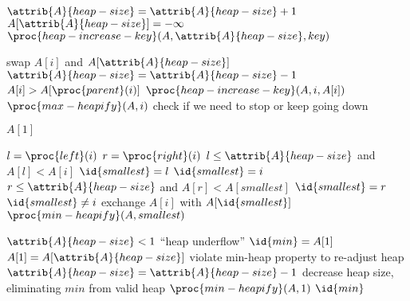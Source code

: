 \documentclass[12pt]{article}
\begin{document}
\begin{codebox}
\li $\attrib{A}{heap-size} = \attrib{A}{heap-size} + 1$
\li $A[\attrib{A}{heap-size}] = -\infty$
\li $\proc{heap-increase-key}(A, \attrib{A}{heap-size}, key)$
\end{codebox}

\begin{codebox}
\li swap $A[i]$ and $A[\attrib{A}{heap-size}]$
\li $\attrib{A}{heap-size} = \attrib{A}{heap-size} - 1$
\li \If $A[i] > A[\proc{parent}(i)]$
\li \Then
        $\proc{heap-increase-key}(A, i, A[i])$
    \End
\li \Else
\li \Then
        $\proc{max-heapify}(A, i)$ \Comment check if we need to stop or keep going down
    \End
\end{codebox}

\newpage

\begin{codebox}
\li \Return $A[1]$
\end{codebox}

\begin{codebox}
\li $l = \proc{left}(i)$
\li $r = \proc{right}(i)$
\li \If $l \leq \attrib{A}{heap-size}$ and $A[l] < A[i]$
\li     \Then
            $\id{smallest} = l$
\li     \Else
            $\id{smallest} = i$
        \End
\li \If $r \leq \attrib{A}{heap-size}$ and $A[r] < A[smallest]$
\li     \Then
            $\id{smallest} = r$
        \End
\li \If $\id{smallest} \neq i$
\li     \Then
            exchange $A[i]$ with $A[\id{smallest}]$
\li         $\proc{min-heapify}(A, smallest)$
        \End
\end{codebox}

\begin{codebox}
\li \If $\attrib{A}{heap-size} < 1$
\li     \Then
            \Error ``heap underflow''
        \End
\li $\id{min} = A[1]$
\li $A[1] = A[\attrib{A}{heap-size}]$ \Comment violate min-heap property to re-adjust heap
\li $\attrib{A}{heap-size} = \attrib{A}{heap-size} - 1$ \Comment decrease heap size, eliminating $min$ from valid heap
\li $\proc{min-heapify}(A, 1)$
\li \Return $\id{min}$
\end{codebox}
\end{document}
